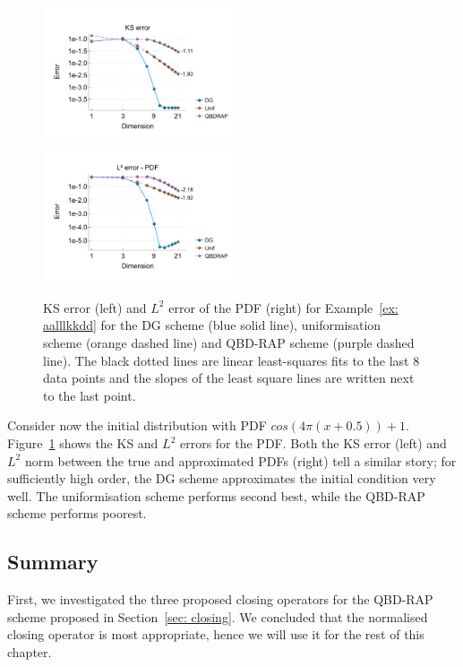 \begin{example}\label{ex: aalllkkdd}
	\begin{figure}[h]
		\centering
		\includegraphics[width=0.5\textwidth,trim={1.1cm 0.8cm 0.1cm 1.25cm},clip]{chapter6/figs/comp/fun9/meshs_ks_error_formatted.pdf}%
		\includegraphics[width=0.5\textwidth,trim={1.1cm 0.8cm 0.1cm 1.25cm},clip]{chapter6/figs/comp/fun9/meshs_l2_pdf_error_formatted.pdf}
		\caption{KS error (left) and \(L^2\) error of the PDF (right) for Example~\ref{ex: aalllkkdd} for the DG scheme (blue solid line), uniformisation scheme (orange dashed line) and QBD-RAP scheme (purple dashed line). The black dotted lines are linear least-squares fits to the last 8 data points and the slopes of the least square lines are written next to the last point.}
		\label{fig: fun 9 comp} 
	\end{figure}
	Consider now the initial distribution with PDF \(cos(4\pi(x+0.5))+1\). Figure~\ref{fig: fun 9 comp} shows the KS and \(L^2\) errors for the PDF. Both the KS error (left) and \(L^2\) norm between the true and approximated PDFs (right) tell a similar story; for sufficiently high order, the DG scheme approximates the initial condition very well. The uniformisation scheme performs second best, while the QBD-RAP scheme performs poorest. 
\end{example}

\subsection*{Summary}
First, we investigated the three proposed closing operators for the QBD-RAP scheme proposed in Section~\ref{sec: closing}. We concluded that the normalised closing operator is most appropriate, hence we will use it for the rest of this chapter. 

